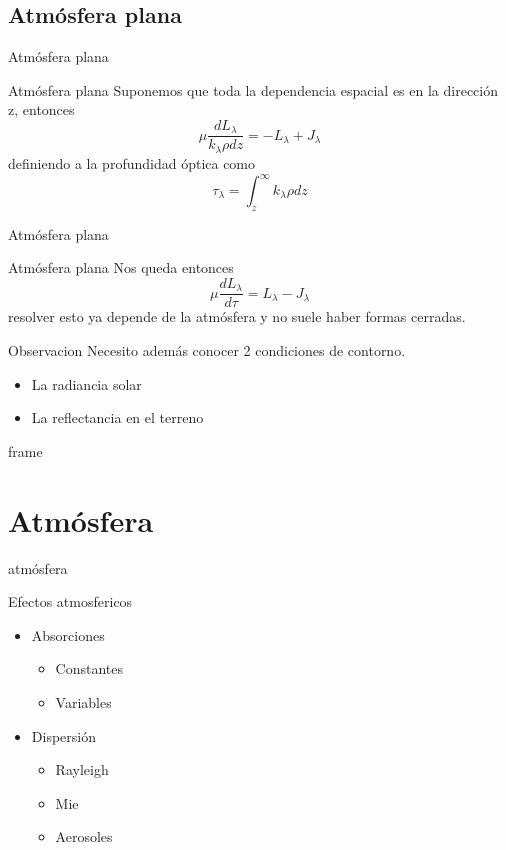 \documentclass[]{beamer}
\begin{document}
\subsection{Atmósfera plana}

\begin{frame}{Atmósfera plana}
  \begin{exampleblock}{Atmósfera plana}
    Suponemos que toda la dependencia espacial es en la dirección z, entonces $$\mu \frac{dL_\lambda}{k_\lambda \rho dz} = -L_\lambda + J_\lambda$$\pause
    definiendo a la profundidad óptica como $$\tau_\lambda = \int_z^\infty k_\lambda \rho dz$$
  \end{exampleblock}
\end{frame}

\begin{frame}{Atmósfera plana}
  \begin{exampleblock}{Atmósfera plana}
    Nos queda entonces
    $$\mu \frac{dL_\lambda}{d\tau} = L_\lambda - J_\lambda$$\pause
    resolver esto ya depende de la atmósfera y no suele haber formas cerradas.
  \end{exampleblock}
  \pause
  \begin{alertblock}{Observacion}
    Necesito además conocer 2 condiciones de contorno.
    \begin{itemize}
      \item La radiancia solar
      \item La reflectancia en el terreno
    \end{itemize}
  \end{alertblock}
\end{frame}

frame

\section{Atmósfera}

\begin{frame}{atmósfera}
  \begin{block}{Efectos atmosfericos}
    \begin{itemize}
      \item<1-3> Absorciones
      \begin{itemize}
        \item<2-3> Constantes
        \item<3> Variables
      \end{itemize}
      \item<4-7> Dispersión
      \begin{itemize}
        \item<5-7> Rayleigh
        \item<6-7> Mie
        \item<7> Aerosoles
      \end{itemize}
    \end{itemize}
  \end{block}
\end{frame}
\end{document}
